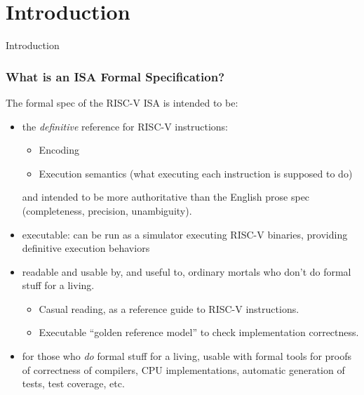 \documentclass[aspectratio=169]{beamer}
\newcommand{\slidefont}{\scriptsize}
\begin{document}

\section{Introduction}


\begin{frame}[fragile]

  \slidefont

  \vfill

  \begin{center}\LARGE
    Introduction
  \end{center}

  \vfill

\end{frame}


\begin{frame}[fragile]
  \frametitle{What is an ISA Formal Specification?}

  \slidefont

  \begin{block}{The formal spec of the RISC-V ISA is intended to be:}
    \begin{itemize}

      \item the \emph{definitive} reference for RISC-V instructions:
        \begin{itemize}\slidefont
          \item Encoding
          \item Execution semantics (what executing each instruction is supposed to do)
        \end{itemize}
        and intended to be more authoritative than the English prose
        spec (completeness, precision, unambiguity).

      \item executable: can be run as a simulator executing RISC-V
        binaries, providing definitive execution behaviors

      \item readable and usable by, and useful to, ordinary mortals who don't do formal stuff for a living.
        \begin{itemize}\slidefont
          \item Casual reading, as a reference guide to RISC-V instructions.
          \item Executable ``golden reference model'' to check implementation correctness.
        \end{itemize}

      \item for those who \emph{do} formal stuff for a living, usable
        with formal tools for proofs of correctness of compilers, CPU
        implementations, automatic generation of tests, test coverage,
        etc.
    \end{itemize}
  \end{block}

\end{frame}
\end{document}
